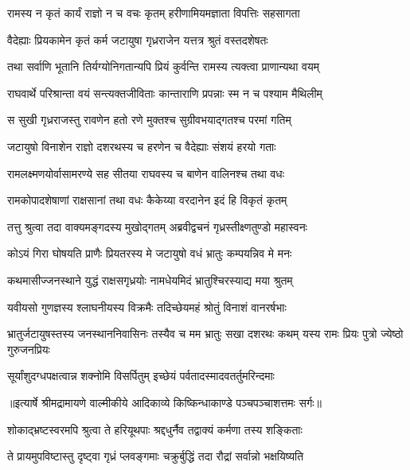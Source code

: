 \twolineshloka
{रामस्य न कृतं कार्यं राज्ञो न च वचः कृतम्}
{हरीणामियमज्ञाता विपत्तिः सहसागता} %

\twolineshloka
{वैदेह्याः प्रियकामेन कृतं कर्म जटायुषा}
{गृध्रराजेन यत्तत्र श्रुतं वस्तदशेषतः} %

\twolineshloka
{तथा सर्वाणि भूतानि तिर्यग्योनिगतान्यपि}
{प्रियं कुर्वन्ति रामस्य त्यक्त्वा प्राणान्यथा वयम्} %

\twolineshloka
{राघवार्थे परिश्रान्ता वयं सन्त्यक्तजीविताः}
{कान्ताराणि प्रपन्नाः स्म न च पश्याम मैथिलीम्} %

\twolineshloka
{स सुखी गृध्रराजस्तु रावणेन हतो रणे}
{मुक्तश्च सुग्रीवभयाद्गतश्च परमां गतिम्} %

\twolineshloka
{जटायुषो विनाशेन राज्ञो दशरथस्य च}
{हरणेन च वैदेह्याः संशयं हरयो गताः} %

\twolineshloka
{रामलक्ष्मणयोर्वासामरण्ये सह सीतया}
{राघवस्य च बाणेन वालिनश्च तथा वधः} %

\twolineshloka
{रामकोपादशेषाणां राक्षसानां तथा वधः}
{कैकेय्या वरदानेन इदं हि विकृतं कृतम्} %

\twolineshloka
{तत्तु श्रुत्वा तदा वाक्यमङ्गदस्य मुखोद्गतम्}
{अब्रवीद्वचनं गृध्रस्तीक्ष्णतुण्डो महास्वनः} %

\twolineshloka
{कोऽयं गिरा घोषयति प्राणैः प्रियतरस्य मे}
{जटायुषो वधं भ्रातुः कम्पयन्निव मे मनः} %

\twolineshloka
{कथमासीज्जनस्थाने युद्धं राक्षसगृध्रयोः}
{नामधेयमिदं भ्रातुश्चिरस्याद्य मया श्रुतम्} %

\twolineshloka
{यवीयसो गुणज्ञस्य श्लाघनीयस्य विक्रमैः}
{तदिच्छेयमहं श्रोतुं विनाशं वानरर्षभाः} %

\threelineshloka
{भ्रातुर्जटायुषस्तस्य जनस्थाननिवासिनः}
{तस्यैव च मम भ्रातुः सखा दशरथः कथम्}
{यस्य रामः प्रियः पुत्रो ज्येष्ठो गुरुजनप्रियः} %

\twolineshloka
{सूर्यांशुदग्धपक्षत्वान्न शक्नोमि विसर्पितुम्}
{इच्छेयं पर्वतादस्मादवतर्तुमरिन्दमाः} %


{॥इत्यार्षे श्रीमद्रामायणे वाल्मीकीये आदिकाव्ये किष्किन्धाकाण्डे पञ्चपञ्चाशत्तमः सर्गः॥}


\twolineshloka
{शोकाद्भ्रष्टस्वरमपि श्रुत्वा ते हरियूथपाः}
{श्रद्दधुर्नैव तद्वाक्यं कर्मणा तस्य शङ्किताः} %

\twolineshloka
{ते प्रायमुपविष्टास्तु दृष्ट्वा गृध्रं प्लवङ्गमाः}
{चक्रुर्बुद्धिं तदा रौद्रां सर्वान्नो भक्षयिष्यति} %

